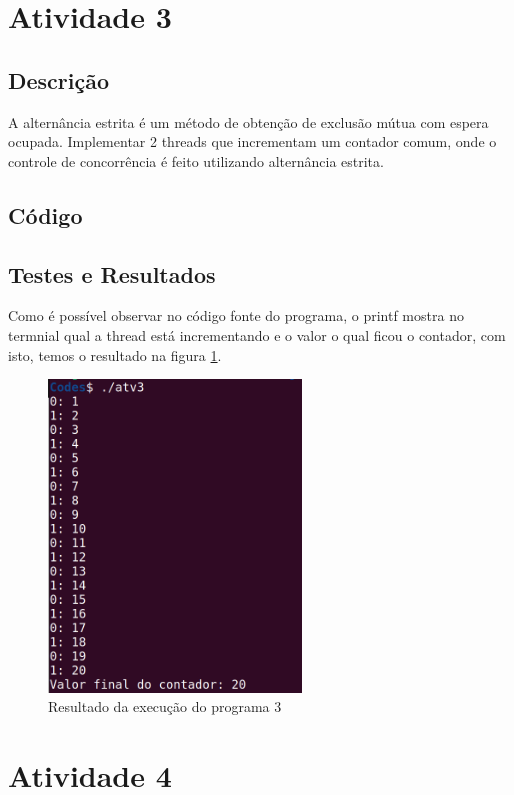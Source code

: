 \documentclass{article}
\begin{document}
\section{Atividade 3}
\subsection{Descrição}
A alternância estrita é um método de obtenção de exclusão mútua com espera ocupada. Implementar 2 threads que incrementam um contador comum, onde o controle de concorrência é feito utilizando alternância estrita.
\subsection{Código}

\subsection{Testes e Resultados}
Como é possível observar no código fonte do programa, o printf mostra no termnial qual a thread está incrementando e o valor o qual ficou o contador, com isto, temos o resultado na figura \ref{fig:atv3_result}.
\begin{figure}[ht]
    \centering
    \includegraphics[width=0.6\textwidth]{./Images/atv3_result.png}
    \caption{Resultado da execução do programa 3}
    \label{fig:atv3_result}
\end{figure}

\section{Atividade 4}
\end{document}

